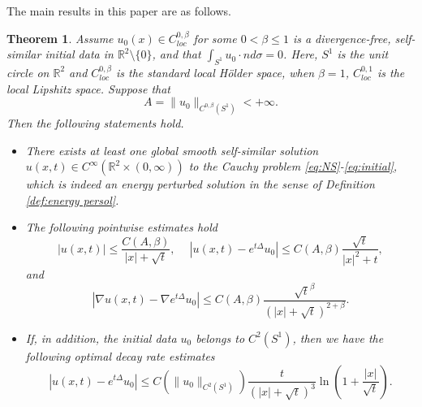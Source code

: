 \documentclass[12pt]{amsart}
\numberwithin{equation}{section}              %
\newtheorem{theorem}{Theorem}[section]
\theoremstyle{remark}
\begin{document}
	The main results in this paper are as follows.
	\begin{theorem}\label{thm:main}
		Assume $u_0(x)\in C^{0,\beta}_{loc}$ for some $0 < \beta\leq 1$ is a divergence-free, self-similar  initial data  in $\mathbb{R}^2\setminus\{0\}$, and that
		$  \int_{ S^1} u_0\cdot n d\sigma = 0 $.
        Here, $S^1$ is the unit circle on $\mathbb{R}^2$ and  $C^{0,\beta}_{loc}$ is the standard local H\"older space, when $\beta=1$, $C^{0,1}_{loc}$ is the local Lipshitz space. 
        Suppose that
		\begin{equation*}
			A=\|u_0\|_{C^{0,\beta}(S^1)}<+\infty. 
		\end{equation*}
		Then the following statements hold.
        \begin{itemize}
            \item[(i)]  
		There exists at least one global  smooth self-similar solution $u (x,t)\in C^{\infty}(\mathbb{R}^2\times (0,\infty)) $ to the Cauchy problem \eqref{eq:NS}-\eqref{eq:initial}, 
  which is indeed an energy perturbed solution in the sense of Definition \ref{def:energy persol}. 
        \item[(ii)]  
		The following pointwise estimates hold
		\begin{equation}\label{eq:pointwisedecay}
			|u(x,t)|\leq \frac{C(A,\beta)}{|x|+\sqrt{t}},\quad  ~|u(x,t)- e^{t\Delta}u_0|\le C(A,\beta)\frac{\sqrt{t}}{|x|^2+t},
		\end{equation}
		and 
		\begin{equation*}
			|\nabla u(x,t)- \nabla e^{t\Delta}u_0|\le C(A,\beta)\frac{\sqrt{t}^{\beta}}{(|x|+\sqrt{t})^{2+\beta}}.
		\end{equation*}
        \item[(iii)] 
		If, in addition, the initial data $u_0$ belongs to $C^2(S^1)$,  then we have the following optimal decay rate estimates
		\begin{equation}\label{eq:optimaldecay}
			| u(x,t)- e^{t\Delta}u_0| \le C(\|u_0\|_{C^2(S^1)})\frac{t}{(|x|+\sqrt{t})^3}\ln\left(1+\frac{|x|}{\sqrt{t}}\right).
		\end{equation}
         \end{itemize}
	\end{theorem}
	
\end{document}
